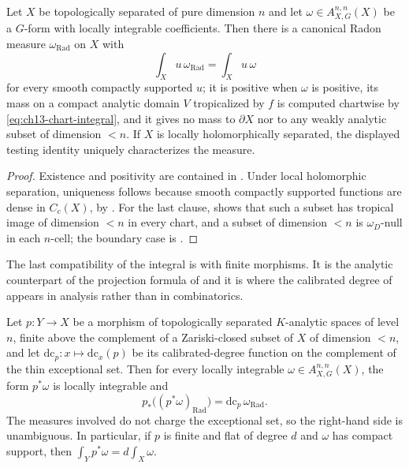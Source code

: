 \begin{corollary}
\label{cor:ch13-measure}
Let $X$ be topologically separated of pure dimension $n$ and let
$\omega\in A^{n,n}_{X,G}(X)$ be a $G$-form with locally integrable
coefficients.  Then there is a canonical Radon measure
$\omega_{\mathrm{Rad}}$ on $X$ with
\[
 \int_Xu\,\omega_{\mathrm{Rad}}=\int_Xu\,\omega
\]
for every smooth compactly supported $u$; it is positive when $\omega$ is
positive, its mass on a compact analytic domain $V$ tropicalized by $f$ is
computed chartwise by \eqref{eq:ch13-chart-integral}, and it gives no mass to
$\partial X$ nor to any weakly analytic subset of dimension $<n$.  If $X$ is
locally holomorphically separated, the displayed testing identity uniquely
characterizes the measure.
\end{corollary}

\begin{proof}
Existence and positivity are contained in
.  Under local holomorphic separation,
uniqueness follows because smooth compactly supported functions are dense in
$C_c(X)$, by \cite[Corollary~15.2.7]{CLD25}.  For the last clause,
 shows that such a subset has tropical
image of dimension $<n$ in every chart, and a subset of dimension $<n$ is
$\omega_D$-null in each $n$-cell; the boundary case is
.
\end{proof}

The last compatibility of the integral is with finite morphisms.  It is the
analytic counterpart of the projection formula of
 and it is where the calibrated degree of
 appears in analysis rather than in combinatorics.

\begin{proposition}
\label{prop:ch13-finite-integral}
Let $p:Y\to X$ be a morphism of topologically separated $K$-analytic spaces
of level $n$, finite above the complement of a Zariski-closed subset of $X$
of dimension $<n$, and let
$\mathrm{dc}_p:x\mapsto\mathrm{dc}_x(p)$ be its calibrated-degree function
on the complement of the thin exceptional set.  Then for every locally
integrable $\omega\in A^{n,n}_{X,G}(X)$, the form $p^*\omega$ is locally
integrable and
\[
 p_*\bigl((p^*\omega)_{\mathrm{Rad}}\bigr)
 =\mathrm{dc}_p\,\omega_{\mathrm{Rad}} .
\]
The measures involved do not charge the exceptional set, so the right-hand
side is unambiguous.  In particular, if $p$ is finite and flat of degree $d$
and $\omega$ has compact support, then
$\int_Yp^*\omega=d\int_X\omega$.
\end{proposition}

